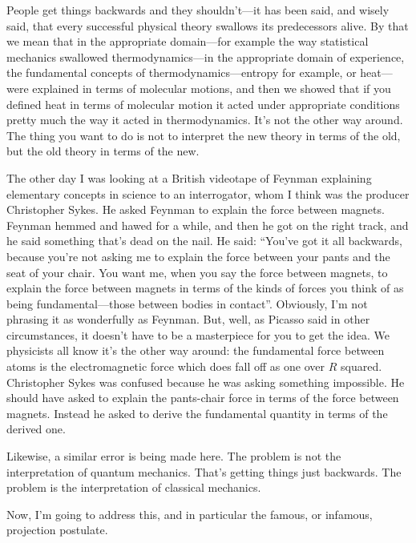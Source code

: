 \documentclass[twocolumn,prb]{revtex4}
\begin{document}
People get things backwards and they shouldn't---it has been said, and wisely said, that every successful physical theory swallows its predecessors alive. By that we mean that in the appropriate domain---for example the way statistical mechanics swallowed thermodynamics---in the appropriate domain of experience, the fundamental concepts of thermodynamics---entropy for example, or heat---were explained in terms of molecular motions, and then we showed that if you defined heat in terms of molecular motion it acted under appropriate conditions pretty much the way it acted in thermodynamics. It's not the other way around. The thing you want to do is not to interpret the new theory in terms of the old, but the old theory in terms of the new.

The other day I was looking at a British videotape of Feynman explaining elementary concepts in science to an interrogator, whom I think was the producer %
Christopher Sykes.  He asked Feynman to explain the force between magnets.
Feynman hemmed and hawed for a while, and then he got on the right track, and he said something that's dead on the nail. He said: ``You've got it all backwards, because you're not asking me to explain the force between %
your pants and the seat of your chair.  You want me, when you say the force between magnets, to explain the force between magnets in terms of the kinds of forces you think of as being fundamental---those between bodies in contact''. Obviously, I'm not phrasing it as wonderfully as Feynman. But, well, as Picasso said in other circumstances, it doesn't have to be a masterpiece for you to get the idea. We physicists all know it's the other way around: the fundamental force between atoms is the electromagnetic force which does fall off as one over $R$ squared. Christopher Sykes was confused because he was asking something impossible.  He should have asked to explain the pants-chair force in terms of the force between magnets.
%
Instead he asked to
derive the fundamental quantity in terms of the derived one.

Likewise, a similar error is being made here. The problem is not the interpretation of quantum mechanics. That's getting things just backwards. The problem is the interpretation of classical mechanics.

Now, I'm going to address this, and in particular the famous, or infamous, projection postulate.
\end{document}
